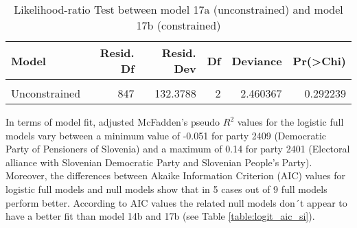 \documentclass[
]{article}
\begin{document}
\begin{table}[!h]

\caption{\label{tab:unnamed-chunk-164}Likelihood-ratio Test between model 17a (unconstrained) and model 17b (constrained)
                  \label{table:lrtest_3_si}}
\centering
\begin{tabular}[t]{l|r|r|r|r|r}
\hline
Model & Resid. Df & Resid. Dev & Df & Deviance & Pr(>Chi)\\
\hline
\cellcolor{gray!6}{Constrained} & \cellcolor{gray!6}{849} & \cellcolor{gray!6}{134.8392} & \cellcolor{gray!6}{} & \cellcolor{gray!6}{} & \cellcolor{gray!6}{}\\
\hline
Unconstrained & 847 & 132.3788 & 2 & 2.460367 & 0.292239\\
\hline
\end{tabular}
\end{table}

In terms of model fit, adjusted McFadden's pseudo \(R^2\) values for the logistic full models vary between
a minimum value of
-0.051
for party 2409
(Democratic Party of Pensioners of Slovenia)
and a maximum of
0.14
for party 2401
(Electoral alliance with Slovenian Democratic Party and Slovenian People's Party).
Moreover, the differences between Akaike Information Criterion (AIC) values for logistic full models and
null models show that in 5 cases out of 9 full models perform better. According to AIC
values the related null models don´t appear to have a better fit than model 14b and 17b (see Table
\ref{table:logit_aic_si}).
\end{document}
